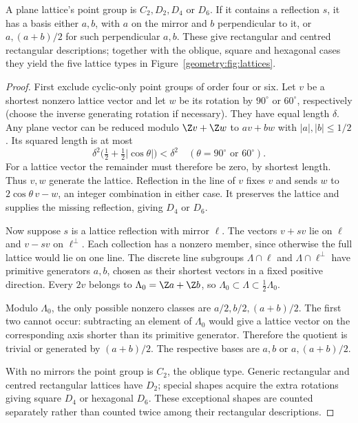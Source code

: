 \begin{proposition}\label{geometry:prop:fivelattices}
A plane lattice's point group is $C_2,D_2,D_4$ or $D_6$. If it contains a reflection $s$, it has a basis either $a,b$, with $a$ on the mirror and $b$ perpendicular to it, or $a,(a+b)/2$ for such perpendicular $a,b$. These give rectangular and centred rectangular descriptions; together with the oblique, square and hexagonal cases they yield the five lattice types in Figure~\ref{geometry:fig:lattices}.
\end{proposition}
\begin{proof}
First exclude cyclic-only point groups of order four or six. Let $v$ be a shortest nonzero lattice vector and let $w$ be its rotation by $90^\circ$ or $60^\circ$, respectively (choose the inverse generating rotation if necessary). They have equal length $\delta$. Any plane vector can be reduced modulo $\Z v+\Z w$ to $av+bw$ with $|a|,|b|\le1/2$. Its squared length is at most
\[
\delta^2\bigl(\tfrac12+\tfrac12|\cos\theta|\bigr)<\delta^2
\quad(\theta=90^\circ\text{ or }60^\circ).
\]
For a lattice vector the remainder must therefore be zero, by shortest length. Thus $v,w$ generate the lattice. Reflection in the line of $v$ fixes $v$ and sends $w$ to $2\cos\theta\,v-w$, an integer combination in either case. It preserves the lattice and supplies the missing reflection, giving $D_4$ or $D_6$.

Now suppose $s$ is a lattice reflection with mirror $\ell$. The vectors $v+sv$ lie on $\ell$ and $v-sv$ on $\ell^\perp$. Each collection has a nonzero member, since otherwise the full lattice would lie on one line. The discrete line subgroups $\Lambda\cap\ell$ and $\Lambda\cap\ell^\perp$ have primitive generators $a,b$, chosen as their shortest vectors in a fixed positive direction. Every $2v$ belongs to $\Lambda_0=\Z a+\Z b$, so $\Lambda_0\subset\Lambda\subset\tfrac12\Lambda_0$.

Modulo $\Lambda_0$, the only possible nonzero classes are $a/2,b/2,(a+b)/2$. The first two cannot occur: subtracting an element of $\Lambda_0$ would give a lattice vector on the corresponding axis shorter than its primitive generator. Therefore the quotient is trivial or generated by $(a+b)/2$. The respective bases are $a,b$ or $a,(a+b)/2$.

With no mirrors the point group is $C_2$, the oblique type. Generic rectangular and centred rectangular lattices have $D_2$; special shapes acquire the extra rotations giving square $D_4$ or hexagonal $D_6$. These exceptional shapes are counted separately rather than counted twice among their rectangular descriptions.
\end{proof}

